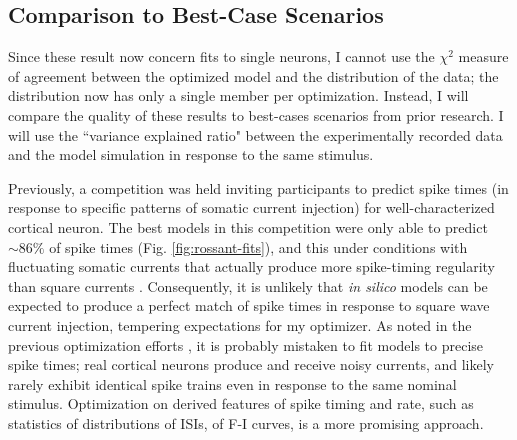\subsection{Comparison to Best-Case Scenarios}
Since these result now concern fits to single neurons, I cannot use the $\chi^2$ measure of agreement between the optimized model and the distribution of the data; the distribution now has only a single member per optimization.
Instead, I will compare the quality of these results to best-cases scenarios from prior research.
I will use the ``variance explained ratio" between the experimentally recorded data and the model simulation in response to the same stimulus.

Previously, a competition was held \citep{incf_multi} inviting participants to predict spike times (in response to specific patterns of somatic current injection) for well-characterized cortical neuron.
The best models in this competition were only able to predict $\sim86\%$ of spike times (Fig. \ref{fig:rossant-fits}), and this under conditions with fluctuating somatic currents that actually produce more spike-timing regularity than square currents \citep{mainen1995reliability}.
Consequently, it is unlikely that \emph{in silico} models can be expected to produce a perfect match of spike times in response to square wave current injection, tempering expectations for my optimizer.
As noted in the previous optimization efforts \citep{druckmann2007novel}, it is probably mistaken to fit models to precise spike times; real cortical neurons produce and receive noisy currents, and likely rarely exhibit identical spike trains even in response to the same nominal stimulus.
Optimization on derived features of spike timing and rate, such as statistics of distributions of ISIs, of F-I curves, is a more promising approach.

